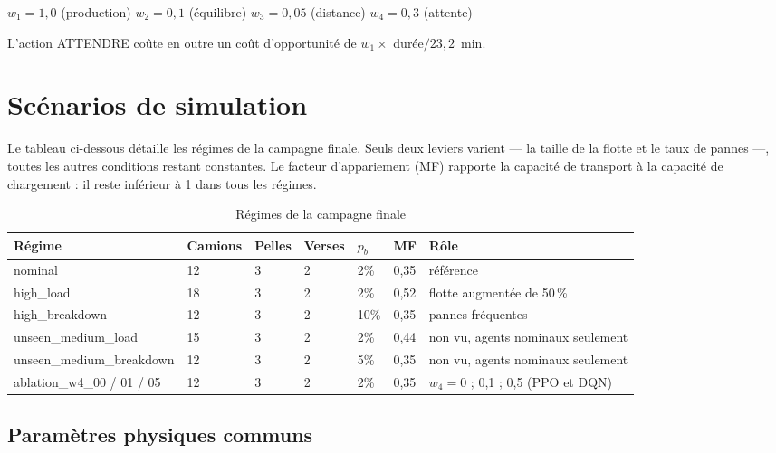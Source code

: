 \documentclass[11pt,a4paper]{report}
\begin{document}
\begin{center}
$w_1 = 1{,}0$ (production) \quad $w_2 = 0{,}1$ (équilibre) \quad $w_3 = 0{,}05$ (distance) \quad $w_4 = 0{,}3$ (attente)
\end{center}

L'action ATTENDRE coûte en outre un coût d'opportunité de $w_1 \times$ durée$/23{,}2$~min.

\chapter{Scénarios de simulation}
\label{ann:scenarios}

Le tableau ci-dessous d\'etaille les r\'egimes de la campagne finale. Seuls deux leviers varient --- la taille de la flotte et le taux de pannes ---, toutes les autres conditions restant constantes. Le facteur d'appariement (MF) rapporte la capacit\'e de transport \`a la capacit\'e de chargement : il reste inf\'erieur \`a 1 dans tous les r\'egimes.

\begin{table}[H]
\centering
\caption{Régimes de la campagne finale}
\small
\begin{tabular}{llllllp{4.6cm}}
\toprule
\textbf{Régime} & \textbf{Camions} & \textbf{Pelles} & \textbf{Verses} & \textbf{$p_b$} & \textbf{MF} & \textbf{Rôle} \\
\midrule
nominal & 12 & 3 & 2 & 2\% & 0,35 & référence \\
high\_load & 18 & 3 & 2 & 2\% & 0,52 & flotte augmentée de 50\,\% \\
high\_breakdown & 12 & 3 & 2 & 10\% & 0,35 & pannes fréquentes \\
unseen\_medium\_load & 15 & 3 & 2 & 2\% & 0,44 & non vu, agents nominaux seulement \\
unseen\_medium\_breakdown & 12 & 3 & 2 & 5\% & 0,35 & non vu, agents nominaux seulement \\
ablation\_w4\_00 / 01 / 05 & 12 & 3 & 2 & 2\% & 0,35 & $w_4 = 0$ ; 0,1 ; 0,5 (PPO et DQN) \\
\bottomrule
\end{tabular}
\end{table}

\section*{Paramètres physiques communs}
\end{document}
